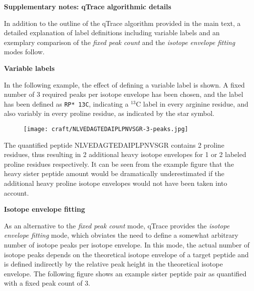 \documentclass[11pt,letterpaper]{article}
\begin{document}
{\bf \LARGE Supplementary notes: qTrace algorithmic details}

In addition to the outline of the qTrace algorithm provided in the main text,
a detailed explanation of label definitions including variable labels and an 
exemplary comparison of the {\em fixed peak count} and the 
{\em isotope envelope fitting} modes follow.



{\bf \large Variable labels}

% 
% 

In the following example, the effect of defining a variable label is shown.
A fixed number of 3 required peaks per isotope envelope has been chosen, and the 
label has been defined as {\tt RP* 13C}, indicating a $^{13}$C label in every arginine 
residue, and also variably in every proline residue, as indicated 
by the star symbol.

\begin{figure}[h]
\texttt{[image: craft/NLVEDAGTEDAIPLPNVSGR-3-peaks.jpg]}
\end{figure}

The quantified peptide NLVEDAGTEDAIPLPNVSGR contains 2 proline residues, thus
resulting in 2 additional heavy isotope envelopes for 1 or 2 labeled proline 
residues respectively.
It can be seen from the example figure that the heavy sister peptide amount 
would be dramatically underestimated if the additional heavy proline isotope 
envelopes would not have been taken into account.

{\bf \large Isotope envelope fitting}

As an alternative to the {\em fixed peak count} mode, qTrace provides the
{\em isotope envelope fitting} mode, which obviates the need to define a
somewhat arbitrary number of isotope peaks per isotope envelope. In this mode,
the actual number of isotope peaks depends on the theoretical isotope envelope
of a target peptide and is defined indirectly by the relative peak height in 
the theoretical isotope envelope. The following figure shows an example sister 
peptide pair as quantified with a fixed peak count of 3.
\end{document}
